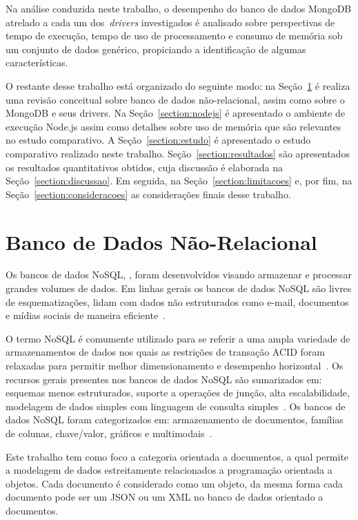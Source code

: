 \documentclass[12pt]{article}
\begin{document}
Na análise conduzida neste trabalho, o desempenho do banco de dados MongoDB atrelado a cada um dos~\emph{drivers} investigados é analisado sobre perspectivas de tempo de execução, tempo de uso de processamento e consumo de memória sob um conjunto de dados genérico, propiciando a identificação de algumas características.

O restante desse trabalho está organizado do seguinte modo: na Seção~\ref{section:nao-relacional} é realiza uma revisão conceitual sobre banco de dados não-relacional, assim como sobre o MongoDB e seus drivers. Na Seção~\ref{section:nodejs} é apresentado o ambiente de execução Node.js assim como detalhes sobre uso de memória que são relevantes no estudo comparativo. A Seção~\ref{section:estudo} é apresentado o estudo comparativo realizado neste trabalho. Seção~\ref{section:resultados} são apresentados os resultados quantitativos obtidos, cuja discussão é elaborada na Seção~\ref{section:discussao}. Em seguida, na Seção~\ref{section:limitacoes} e, por fim, na Seção~\ref{section:consideracoes} as considerações finais desse trabalho.


\section{Banco de Dados Não-Relacional}
\label{section:nao-relacional}

Os bancos de dados NoSQL, , foram desenvolvidos visando armazenar e processar grandes volumes de dados. Em linhas gerais os bancos de dados NoSQL são livres de esquematizações, lidam com dados não estruturados como e-mail, documentos e mídias sociais de maneira eficiente~\cite{mohamed:2014,ramesh:2016}.

O termo NoSQL é comumente utilizado para se referir a uma ampla variedade de armazenamentos de dados nos quais as restrições de transação ACID foram relaxadas para permitir melhor dimensionamento e desempenho horizontal~\cite{rafique:2018}. Os recursos gerais presentes nos bancos de dados NoSQL são sumarizados em: esquemas menos estruturados, suporte a operações de junção, alta escalabilidade, modelagem de dados simples com linguagem de consulta simples~\cite{ramesh:2016}. Os bancos de dados NoSQL foram categorizados em: armazenamento de documentos, famílias de colunas, chave/valor, gráficos e multimodais~\cite{aparicio:2016}.

Este trabalho tem como foco a categoria orientada a documentos, a qual permite a modelagem de dados estreitamente relacionados a programação orientada a objetos. 
Cada documento é considerado como um objeto, da mesma forma cada documento pode ser um JSON ou um XML no banco de dados orientado a documentos. 
\end{document}
